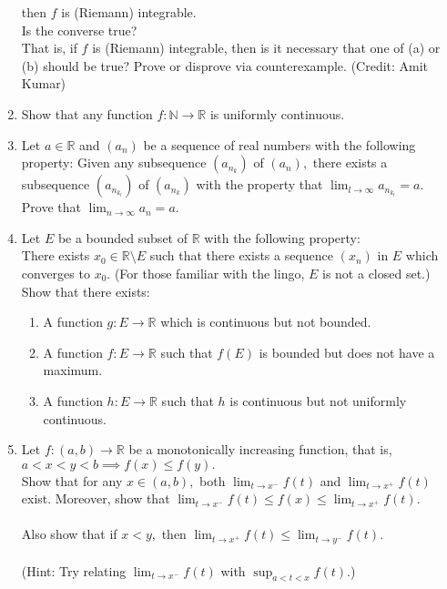 \documentclass{article}
\begin{document}
\begin{enumerate}
\begin{enumerate}
	\end{enumerate}
	then $f$ is (Riemann) integrable.\\
	Is the converse true?\\
	That is, if $f$ is (Riemann) integrable, then is it necessary that one of (a) or (b) should be true? Prove or disprove via counterexample. \hfill (Credit: Amit Kumar)
	\item Show that any function $f:\mathbb{N} \to \mathbb{R}$ is uniformly continuous.
	\item Let $a \in \mathbb{R}$ and $(a_n)$ be a sequence of real numbers with the following property: Given any subsequence $\left(a_{n_k}\right)$ of $(a_n),$ there exists a subsequence $\left(a_{n_{k_l}}\right)$ of $\left(a_{n_k}\right)$ with the property that $\displaystyle\lim_{l\to \infty}a_{n_{k_l}}	= a.$\\
	Prove that $\displaystyle\lim_{n\to \infty}a_n = a.$
	\item Let $E$ be a bounded subset of $\mathbb{R}$ with the following property:\\
	There exists $x_0 \in \mathbb{R}\setminus E$ such that there exists a sequence $(x_n)$ in $E$ which converges to $x_0.$ (For those familiar with the lingo, $E$ is not a closed set.)\\
	Show that there exists:
	\begin{enumerate}[nosep] 
		\item A function $g:E\to \mathbb{R}$ which is continuous but not bounded.
		\item A function $f:E\to \mathbb{R}$ such that $f(E)$ is bounded but does not have a maximum.
		\item A function $h:E\to \mathbb{R}$ such that $h$ is continuous but not uniformly continuous.
	\end{enumerate}
	\item Let $f:(a, b) \to \mathbb{R}$ be a monotonically increasing function, that is, $a < x < y < b \implies f(x) \le f(y).$\\
	Show that for any $x \in (a, b),$ both $\displaystyle\lim_{t\to x^-}f(t)$ and $\displaystyle\lim_{t\to x^+}f(t)$ exist. Moreover, show that $\displaystyle\lim_{t\to x^-}f(t) \le f(x) \le \displaystyle\lim_{t\to x^+}f(t).$\\~\\
	Also show that if $x < y,$ then $\displaystyle\lim_{t\to x^+}f(t) \le \displaystyle \lim_{t\to y^-}f(t).$\\~\\
	(Hint: Try relating $\displaystyle\lim_{t\to x^-}f(t)$ with $\displaystyle\sup_{a < t < x}f(t).$)

\end{enumerate}
\end{document}
